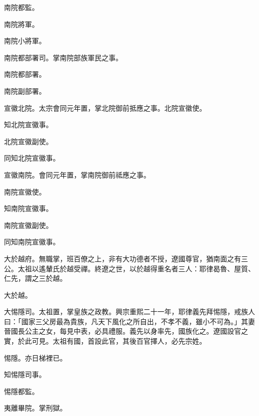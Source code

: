 \begin{pinyinscope}
 南院都監。



 南院將軍。



 南院小將軍。



 南院都部署司。掌南院部族軍民之事。



 南院都部署。



 南院副部署。



 宣徽北院。太宗會同元年置，掌北院御前抵應之事。北院宣徽使。



 知北院宣徽事。



 北院宣徽副使。



 同知北院宣徽事。



 宣徽南院。會同元年置，掌南院御前祗應之事。



 南院宣徽使。



 知南院宣徽事。



 南院宣徽副使。



 同知南院宣徽事。



 大於越府。無職掌，班百僚之上，非有大功德者不授，遼國尊官，猶南面之有三公。太祖以遙輦氏於越受禪。終遼之世，以於越得重名者三人：耶律曷魯、屋質、仁先，謂之三於越。



 大於越。



 大惕隱司。太祖置，掌皇族之政教。興宗重熙二十一年，耶律義先拜惕隱，戒族人曰：「國家三父房最為貴族，凡天下風化之所自出，不孝不義，雖小不可為。」其妻晉國長公主之女，每見中表，必具禮服。義先以身率先，國族化之。遼國設官之實，於此可見。太祖有國，首設此官，其後百官擇人，必先宗姓。



 惕隱。亦日梯裡已。



 知惕隱司事。



 惕隱都監。



 夷離畢院。掌刑獄。




\end{pinyinscope}
